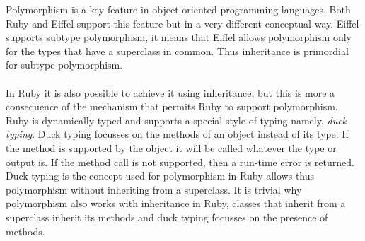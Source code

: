 \documentclass[12pt,a4paper,twocolumn]{article}
\begin{document}
Polymorphism is a key feature in object-oriented programming languages. Both Ruby and Eiffel support this feature but in a very different conceptual way. Eiffel supports subtype polymorphism, it means that Eiffel allows polymorphism only for the types that have a superclass in common. Thus inheritance is primordial for  subtype polymorphism. 
\\
\\ 
In Ruby it is also possible to achieve it using inheritance, but this is more a consequence of the mechanism that permits Ruby to support polymorphism. Ruby is dynamically typed and supports a special style of typing namely, \emph{duck typing}. Duck typing focusses on the methods of an object instead of its type. If the method is supported by the object it will be called whatever the type or output is. If the method call is not supported, then a run-time error is returned. Duck typing is the concept used for polymorphism in Ruby allows thus polymorphism without inheriting from a superclass. It is trivial why polymorphism also works with inheritance in Ruby, classes that inherit from a superclass inherit its methods and duck typing focusses on the presence of methods.
\\
\\
\end{document}
